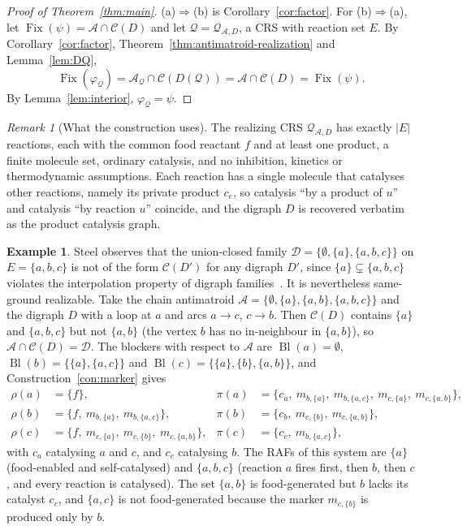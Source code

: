 \documentclass[11pt,a4paper]{article}
\theoremstyle{plain}
\theoremstyle{definition}
\newtheorem{example}[theorem]{Example}
\theoremstyle{remark}
\newtheorem{remark}[theorem]{Remark}
\newcommand{\Fix}{\operatorname{Fix}}
\newcommand{\Bl}{\operatorname{Bl}}
\newcommand{\cA}{\mathcal{A}}
\newcommand{\cC}{\mathcal{C}}
\newcommand{\cD}{\mathcal{D}}
\newcommand{\cQ}{\mathcal{Q}}
\begin{document}
\begin{proof}[Proof of Theorem~\ref{thm:main}]
(a)$\Rightarrow$(b) is Corollary~\ref{cor:factor}. For (b)$\Rightarrow$(a), let $\Fix(\psi)=\cA\cap\cC(D)$ and let $\cQ=\cQ_{\cA,D}$, a CRS with reaction set $E$. By Corollary~\ref{cor:factor}, Theorem~\ref{thm:antimatroid-realization} and Lemma~\ref{lem:DQ},
\[
\Fix(\varphi_{\cQ})=\cA_{\cQ}\cap\cC(D(\cQ))=\cA\cap\cC(D)=\Fix(\psi).
\]
By Lemma~\ref{lem:interior}, $\varphi_{\cQ}=\psi$.
\end{proof}

\begin{remark}[What the construction uses]
The realizing CRS $\cQ_{\cA,D}$ has exactly $|E|$ reactions, each with the common food reactant $f$ and at least one product, a finite molecule set, ordinary catalysis, and no inhibition, kinetics or thermodynamic assumptions. Each reaction has a single molecule that catalyses other reactions, namely its private product $c_e$, so catalysis ``by a product of $u$'' and catalysis ``by reaction $u$'' coincide, and the digraph $D$ is recovered verbatim as the product catalysis graph.
\end{remark}

\begin{example}\label{ex:small}
Steel observes that the union-closed family $\cD=\{\emptyset,\{a\},\{a,b,c\}\}$ on $E=\{a,b,c\}$ is not of the form $\cC(D')$ for any digraph $D'$, since $\{a\}\subsetneq\{a,b,c\}$ violates the interpolation property of digraph families~\cite[Proposition~2(ii)]{steel2023interior}. It is nevertheless same-ground realizable. Take the chain antimatroid $\cA=\{\emptyset,\{a\},\{a,b\},\{a,b,c\}\}$ and the digraph $D$ with a loop at $a$ and arcs $a\to c$, $c\to b$. Then $\cC(D)$ contains $\{a\}$ and $\{a,b,c\}$ but not $\{a,b\}$ (the vertex $b$ has no in-neighbour in $\{a,b\}$), so $\cA\cap\cC(D)=\cD$. The blockers with respect to $\cA$ are $\Bl(a)=\emptyset$, $\Bl(b)=\{\{a\},\{a,c\}\}$ and $\Bl(c)=\{\{a\},\{b\},\{a,b\}\}$, and Construction~\ref{con:marker} gives
\begin{align*}
\rho(a)&=\{f\}, & \pi(a)&=\{c_a,\ m_{b,\{a\}},\ m_{b,\{a,c\}},\ m_{c,\{a\}},\ m_{c,\{a,b\}}\},\\
\rho(b)&=\{f,\ m_{b,\{a\}},\ m_{b,\{a,c\}}\}, & \pi(b)&=\{c_b,\ m_{c,\{b\}},\ m_{c,\{a,b\}}\},\\
\rho(c)&=\{f,\ m_{c,\{a\}},\ m_{c,\{b\}},\ m_{c,\{a,b\}}\}, & \pi(c)&=\{c_c,\ m_{b,\{a,c\}}\},
\end{align*}
with $c_a$ catalysing $a$ and $c$, and $c_c$ catalysing $b$. The RAFs of this system are $\{a\}$ (food-enabled and self-catalysed) and $\{a,b,c\}$ (reaction $a$ fires first, then $b$, then $c$, and every reaction is catalysed). The set $\{a,b\}$ is food-generated but $b$ lacks its catalyst $c_c$, and $\{a,c\}$ is not food-generated because the marker $m_{c,\{b\}}$ is produced only by $b$.
\end{example}
\end{document}
